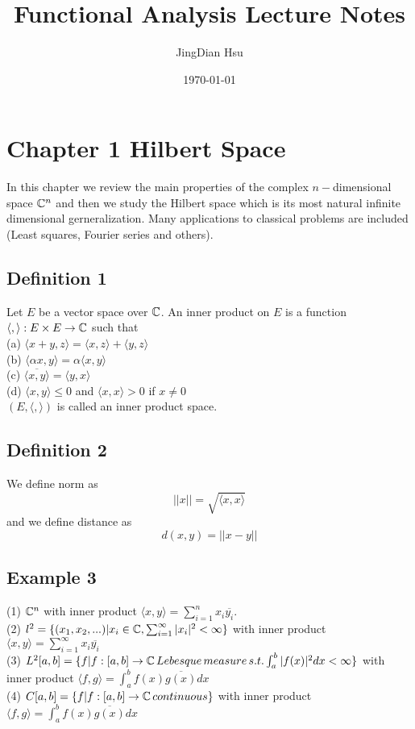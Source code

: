 \documentclass{article}
\title{Functional Analysis Lecture Notes}
\author{JingDian Hsu}
\date\today
\begin{document}
\maketitle %
\clearpage
\section*{Chapter 1 Hilbert Space}
\qquad In this chapter we review the main properties of the complex $n-$dimensional space $\Bbb{C}^n$ and then we study the Hilbert space which is its most natural infinite dimensional gerneralization. Many applications to classical problems are included (Least squares, Fourier series and others).

\subsection*{Definition 1}
Let $E$ be a vector space over $\Bbb{C}$. An inner product on $E$ is a function $\langle ,\rangle:E\times E \rightarrow \Bbb{C}$ such that \\
(a) $\langle x+y, z\rangle = \langle x, z\rangle +\langle y, z\rangle$\\
(b) $\langle\alpha x, y\rangle=\alpha\langle x,y\rangle$\\
(c) $\overline{\langle x,y\rangle}=\langle y,x\rangle$\\
(d) $\langle x,y\rangle\leq 0$ and $\langle x,x \rangle >0$ if $x\neq0$ \\
$(E, \langle, \rangle)$ is called an inner product space.

\subsection*{Definition 2}
We define norm as 
\[
|| x || = \sqrt{\langle x,x \rangle} 
\]
and we define distance as
\[
d(x,y)=||x-y||
\]

\subsection*{Example 3}
(1) $\Bbb{C}^n$ with inner product $\langle x, y \rangle = \sum_{i=1}^{n} x_i \overline{y_i}$.\\
(2) $l^2 =  \{(x_1, x_2, ...)| x_i\in \Bbb{C}, \sum_{i=1}^{\infty}| x_i |^2 < \infty \}$ with inner product $\langle x,y \rangle = \sum_{i=1}^{\infty} x_i \overline{y_i}$\\
(3) $L^2[a,b] = \{f| f:[a,b] \rightarrow \Bbb{C} \, Lebesque \, measure \, s.t. \int_{a}^{b} |f(x)|^2 dx< \infty \}$ with inner product $\langle f,g \rangle =\int_{a}^{b} f(x) \overline{g(x)} dx$\\
(4) $C[a,b] = \{f|f:[a,b]\rightarrow \Bbb{C} \, continuous\} $ with inner product $\langle f,g \rangle = \int_{a}^{b} f(x) \overline{g(x)} dx$\\
\end{document}
